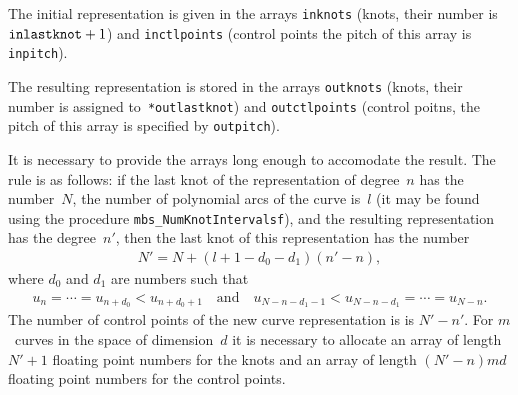 The initial representation is given in the arrays \texttt{inknots}
(knots, their number is $\mathord{\mbox{\texttt{inlastknot}}}+1$) and
\texttt{inctlpoints} (control points the pitch of this array is
\texttt{inpitch}).

The resulting representation is stored in the arrays \texttt{outknots} (knots,
their number is assigned to~\texttt{*outlastknot})
and \texttt{outctlpoints} (control poitns, the pitch of this array is
specified by \texttt{outpitch}).

It is necessary to provide the arrays long enough to accomodate the result.
The rule is as follows: if the last knot of the representation of degree~$n$
has the number~$N$, the number of polynomial arcs of the curve is~$l$
(it may be found using the procedure \texttt{mbs\_NumKnotIntervalsf}),
and the resulting representation has the degree~$n'$, then the last knot
of this representation has the number
\begin{align*}
  N' = N+(l+1-d_0-d_1)(n'-n),
\end{align*}
where $d_0$ and $d_1$ are numbers such that
\begin{align*}
  u_n=\cdots=u_{n+d_0}<u_{n+d_0+1}\quad\mbox{and}\quad
  u_{N-n-d_1-1}<u_{N-n-d_1}=\cdots=u_{N-n}.
\end{align*}
The number of control points of the new curve representation is is $N'-n'$.
For $m$~curves in the space of dimension~$d$ it is necessary to allocate
an array of length $N'+1$ floating point numbers for the knots and an array
of length $(N'-n)md$ floating point numbers for the control points.


